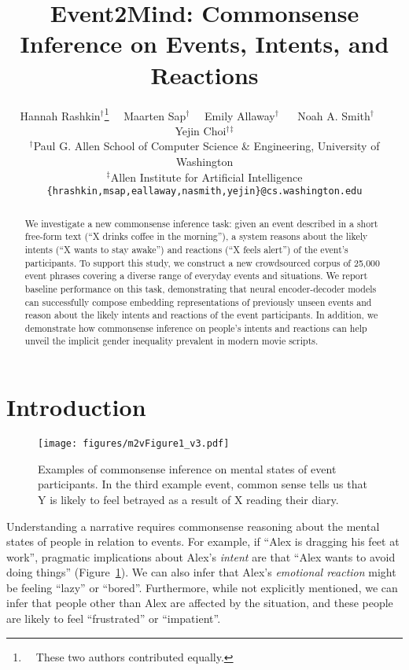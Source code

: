 \documentclass[11pt,a4paper]{article}
\title{Event2Mind: Commonsense Inference on Events, Intents, and Reactions 
}
\author{Hannah Rashkin$^\dagger$\thanks{~~These two authors contributed equally.}~~ Maarten Sap$^\dagger$\footnotemark[1] ~~ Emily Allaway$^\dagger$ ~~ Noah A. Smith$^\dagger$ ~~ Yejin Choi$^\dagger$$^\ddagger$ \\
  $^\dagger$Paul G. Allen School of Computer Science \& Engineering, University of Washington \\
  $^\ddagger$Allen Institute for Artificial Intelligence\\
  {\tt \{hrashkin,msap,eallaway,nasmith,yejin\}@cs.washington.edu} }
\begin{document}
\maketitle


\begin{abstract}
We investigate a new commonsense inference task: given an event described in a short free-form text ({``X drinks coffee in the morning''}), a system reasons about the likely intents ({``X wants to stay awake''}) and reactions ({``X feels alert''}) of the event's participants. 
To support this study, we construct 
a new crowdsourced corpus of 25,000 event phrases covering a diverse range of everyday events and situations. We report baseline performance on this task, demonstrating that neural encoder-decoder models can successfully compose embedding representations of previously unseen events and reason about the likely intents and reactions of the event participants. 
In addition, we demonstrate how commonsense inference on people's intents and reactions can help unveil the implicit gender inequality prevalent in modern movie scripts.

\end{abstract}


\section{Introduction}




\begin{figure}
    \centering
    \texttt{[image: figures/m2vFigure1\_v3.pdf]}
    \caption{Examples of commonsense inference on mental states of event participants.
    In the third example event, common sense tells us that Y is likely to feel betrayed as a result of X reading their diary.
}
    \label{fig:commonsenseInferenceExamples}
\end{figure} 

Understanding a narrative  requires commonsense reasoning 
about the  mental states of people in relation to events. 
For example, if ``Alex is dragging his feet at work'', pragmatic implications about Alex's \emph{intent} are that ``Alex wants to avoid doing things'' (Figure~\ref{fig:commonsenseInferenceExamples}). We can also infer that Alex's \emph{emotional reaction} might be feeling ``lazy'' or ``bored''. Furthermore, while not explicitly mentioned, we can infer that people other than Alex are affected by the situation, and these people are likely to feel ``frustrated'' or ``impatient''. 
\end{document}

